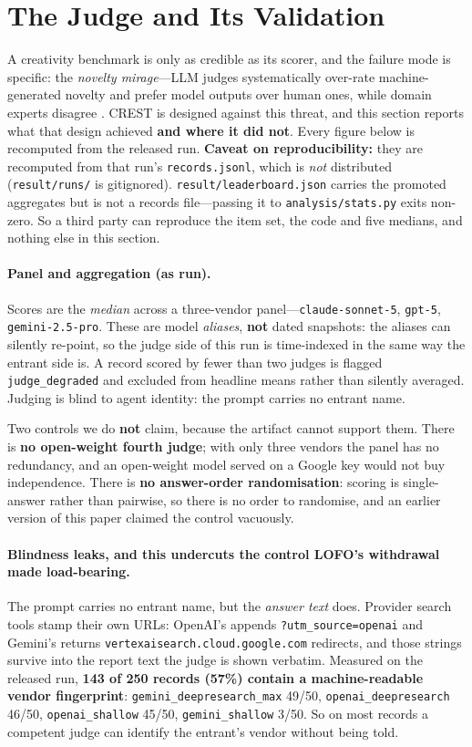 \section{The Judge and Its Validation}
\label{sec:judge}

A creativity benchmark is only as credible as its scorer, and the failure mode is specific: the \emph{novelty mirage}---LLM judges systematically over-rate machine-generated novelty and prefer model outputs over human ones, while domain experts disagree \citep{sinhahajari2026mirage}. CREST is designed against this threat, and this section reports what that design achieved \textbf{and where it did not}. Every figure below is recomputed from the released run. \textbf{Caveat on reproducibility:} they are recomputed from that run's \texttt{records.jsonl}, which is \emph{not} distributed (\texttt{result/runs/} is gitignored). \texttt{result/leaderboard.json} carries the promoted aggregates but is not a records file---passing it to \texttt{analysis/stats.py} exits non-zero. So a third party can reproduce the item set, the code and five medians, and nothing else in this section.

\paragraph{Panel and aggregation (as run).} Scores are the \emph{median} across a three-vendor panel---\texttt{claude-sonnet-5}, \texttt{gpt-5}, \texttt{gemini-2.5-pro}. These are model \emph{aliases}, \textbf{not} dated snapshots: the aliases can silently re-point, so the judge side of this run is time-indexed in the same way the entrant side is. A record scored by fewer than two judges is flagged \texttt{judge\_degraded} and excluded from headline means rather than silently averaged. Judging is blind to agent identity: the prompt carries no entrant name.

Two controls we do \textbf{not} claim, because the artifact cannot support them. There is \textbf{no open-weight fourth judge}; with only three vendors the panel has no redundancy, and an open-weight model served on a Google key would not buy independence. There is \textbf{no answer-order randomisation}: scoring is single-answer rather than pairwise, so there is no order to randomise, and an earlier version of this paper claimed the control vacuously.

\paragraph{Blindness leaks, and this undercuts the control LOFO's withdrawal made load-bearing.} The prompt carries no entrant name, but the \emph{answer text} does. Provider search tools stamp their own URLs: OpenAI's appends \texttt{?utm\_source=openai} and Gemini's returns \texttt{vertexaisearch.cloud.google.com} redirects, and those strings survive into the report text the judge is shown verbatim. Measured on the released run, \textbf{143 of 250 records (57\%) contain a machine-readable vendor fingerprint}: \texttt{gemini\_deepresearch\_max} 49/50, \texttt{openai\_deepresearch} 46/50, \texttt{openai\_shallow} 45/50, \texttt{gemini\_shallow} 3/50. So on most records a competent judge can identify the entrant's vendor without being told.


